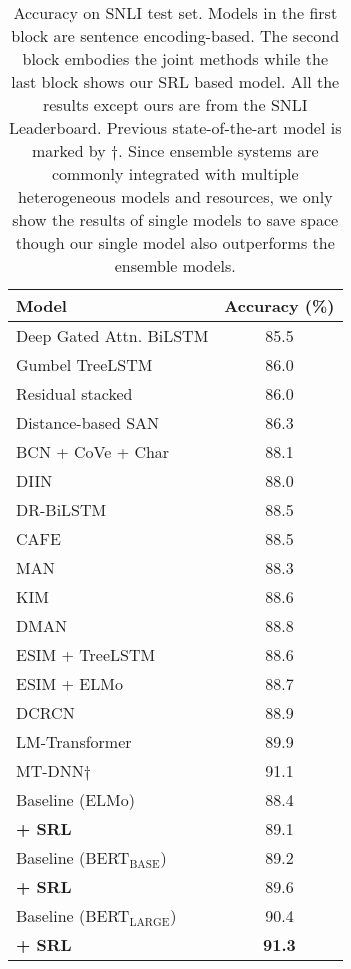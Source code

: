 \documentclass[11pt]{article}
\begin{document}
\begin{table}[H]
	\centering
	{
		\begin{tabular}{l c}
			\hline
			
			\hline
			Model  & Accuracy (\%) \\ 
			\hline
			Deep Gated Attn. BiLSTM 	 & 85.5 \\
			Gumbel TreeLSTM  	 & 86.0 \\
			Residual stacked  	 & 86.0 \\
			Distance-based SAN  	 	& 86.3 \\
			\hline
			BCN + CoVe + Char   	 & 88.1 \\
			DIIN 		 & 88.0 \\
			DR-BiLSTM   	 & 88.5 \\
			CAFE  	 	 & 88.5\\
			MAN  	 	 & 88.3\\
			KIM  	 	 & 88.6 \\
			DMAN    & 88.8 \\
			ESIM + TreeLSTM   	   & 88.6\\
			ESIM + ELMo   	 	 & 88.7 \\
			DCRCN    & 88.9 \\
			LM-Transformer   & 89.9 \\
			MT-DNN$\dagger$ & 91.1\\
			\hline
			Baseline (ELMo)     &88.4 \\
			\textbf{+ SRL}   &  89.1 \\
			Baseline (BERT$_\text{BASE}$)    &89.2\\
			\textbf{+ SRL}   &  89.6 \\
			Baseline (BERT$_\text{LARGE}$)      & 90.4 \\
			\textbf{+ SRL}    & \textbf{91.3} \\
			\hline
			
			\hline
		\end{tabular}
	}
	
	\caption{\label{tab:snli} Accuracy on SNLI test set. Models in the first block are sentence encoding-based. The second block embodies the joint methods while the last block shows our SRL based model. All the results except ours are from the SNLI Leaderboard. Previous state-of-the-art model is marked by $\dagger$. Since ensemble systems are commonly integrated with multiple heterogeneous models and resources, we only show the results of single models to save space though our single model also outperforms the ensemble models.}
\end{table}
\end{document}
